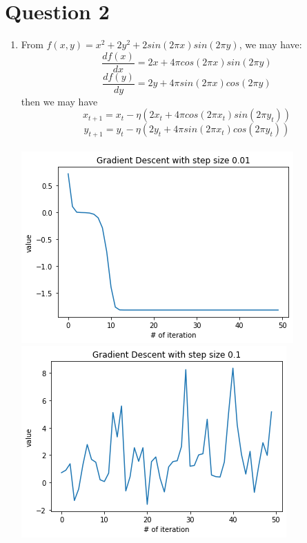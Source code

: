 \documentclass{article}
\def\math#1{$#1$}
\begin{document}
\section{Question 2}

\begin{enumerate}
    \item From \math{f(x, y) = x^2 + 2y^2 + 2sin(2\pi x)sin(2\pi y)}, we may have:
    \begin{equation}
        \frac{df(x)}{dx} = 2x + 4\pi cos(2\pi x)sin(2\pi y)
    \end{equation}
    \begin{equation}
        \frac{df(y)}{dy} = 2y + 4\pi sin(2\pi x)cos(2\pi y)
    \end{equation}
    then we may have 
    \begin{equation}
        x_{t + 1} = x_t - \eta (2x_t + 4\pi cos(2\pi x_t)sin(2\pi y_t))
    \end{equation}
    \begin{equation}
        y_{t + 1} = y_t - \eta (2y_t + 4\pi sin(2\pi x_t)cos(2\pi y_t))
    \end{equation} \\
    \includegraphics[]{2/1} \\ 
    \includegraphics[]{2/2} \\

\end{enumerate}
\end{document}
